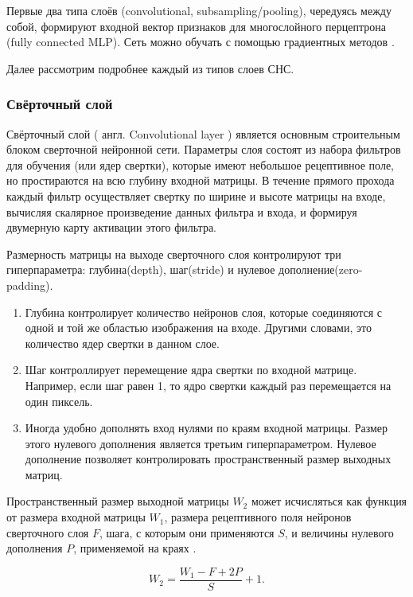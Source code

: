 \documentclass[14pt]{article}
\numberwithin{figure}{section}
\numberwithin{equation}{section}
\begin{document}
Первые два типа слоёв (convolutional, subsampling/pooling), чередуясь между собой, формируют входной вектор признаков для многослойного перцептрона (fully connected MLP). Сеть можно обучать с помощью градиентных методов \cite{Borisov2}.

Далее рассмотрим подробнее каждый из типов слоев СНС.

\subsubsection{Свёрточный слой}

Свёрточный слой ( англ. Convolutional layer ) является основным строительным блоком сверточной нейронной сети. Параметры слоя состоят из набора фильтров для обучения (или ядер свертки), которые имеют небольшое рецептивное поле, но простираются на всю глубину входной матрицы. В течение прямого прохода каждый фильтр осуществляет свертку по ширине и высоте матрицы на входе, вычисляя скалярное произведение данных фильтра и входа, и формируя двумерную карту активации этого фильтра.

Размерность матрицы на выходе сверточного слоя контролируют три гиперпараметра: глубина(depth), шаг(stride) и нулевое дополнение(zero-padding).

\begin{enumerate}
	\item
	Глубина контролирует количество нейронов слоя, которые соединяются с одной и той же областью изображения на входе. Другими словами, это количество ядер свертки в данном слое.
	\item
	Шаг контроллирует перемещение ядра свертки по входной матрице. Например, если шаг равен 1, то ядро свертки каждый раз перемещается на один пиксель.
	\item
	Иногда удобно дополнять вход нулями по краям входной матрицы. Размер этого нулевого дополнения является третьим гиперпараметром. Нулевое дополнение позволяет контролировать пространственный размер выходных матриц.
\end{enumerate}

Пространственный размер выходной матрицы $W_2$ может исчисляться как функция от размера входной матрицы $W_1$, размера рецептивного поля нейронов сверточного слоя $F$, шага, с которым они применяются $S$, и величины нулевого дополнения $P$, применяемой на краях \cite{Stanford}.

\begin{equation}
	W_2 = \frac{W_1 - F + 2P}{S} + 1.
\end{equation}
\end{document}
